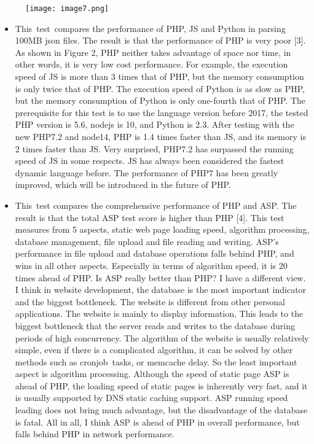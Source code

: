 \documentclass[12pt]{report}
\renewcommand{\_}{\kern-1.5pt\textunderscore\kern-1.5pt}
\begin{document}
\begin{multicols}{2}
\begin{figure}[H]
	\begin{Center}
		\texttt{[image: image7.png]}
	\end{Center}
\end{figure}

\vspace{\baselineskip}\setlength{\parskip}{6.0pt}
\begin{itemize}
	\item {\fontsize{10pt}{12.0pt}\selectfont This\ test\ compares the performance of PHP, JS and Python in parsing 100MB json files. The result is that the performance of PHP is very poor [3]. As shown in Figure 2, PHP neither takes advantage of space nor time, in other words, it is very low cost performance.  For example, the execution speed of JS is more than 3 times that of PHP, but the memory consumption is only twice that of PHP. The execution speed of Python is as slow as PHP, but the memory consumption of Python is only one-fourth that of PHP. The prerequisite for this test is to use the language version before 2017, the tested PHP version is 5.6, nodejs is 10, and Python is 2.3. After testing with the new PHP7.2 and node14, PHP is 1.4 times faster than JS, and its memory is 2 times faster than JS. Very surprised, PHP7.2 has surpassed the running speed of JS in some respects.  JS has always been considered the fastest dynamic language before. The performance of PHP7 has been greatly improved, which will be introduced in the future of PHP.\par}
	\item {\fontsize{10pt}{12.0pt}\selectfont This\ test compares the comprehensive performance of PHP and ASP. The result is that the total ASP test score is higher than PHP [4]. This test measures from 5 aspects, static web page loading speed, algorithm processing, database management, file upload and file reading and writing. ASP's performance in file upload and database operations falls behind PHP, and wins in all other aspects. Especially in terms of algorithm speed, it is 20 times ahead of PHP.  Is ASP really better than PHP? I have a different view. I think in website development, the database is the most important indicator and the biggest bottleneck. The website is different from other personal applications. The website is mainly to display information, This leads to the biggest bottleneck that the server reads and writes to the database during periods of high concurrency. The algorithm of the website is usually relatively simple, even if there is a complicated algorithm, it can be solved by other methods such as cronjob\ tasks, or memcache delay. So the least important aspect is algorithm processing. Although the speed of static page ASP is ahead of PHP, the loading speed of static pages is inherently very fast, and it is usually supported by DNS static caching support. ASP running speed leading does not bring much advantage, but the disadvantage of the database is fatal.  All in all, I think ASP is ahead of PHP in overall performance, but falls behind PHP in network performance.\par}

\end{itemize}
\end{multicols}
\end{document}
